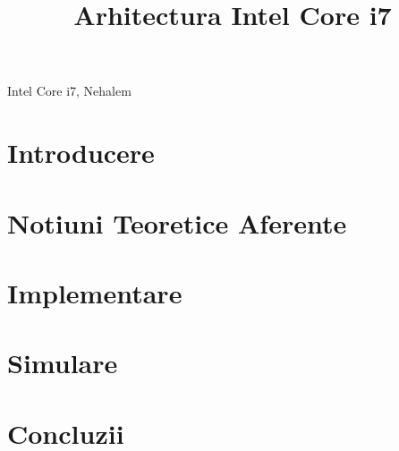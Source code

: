 \documentclass[conference]{IEEEtran}
\begin{document}
\title{Arhitectura Intel Core i7}

\author{
  }

 
\maketitle

\begin{IEEEkeywords}
Intel Core i7, Nehalem
\end{IEEEkeywords}

\section{Introducere}
\label{sec:introducere}


\section{Notiuni Teoretice Aferente}
\label{sec:notiuniteoretice}


\section{Implementare}
\label{sec:implementare}


\section{Simulare} 
\label{sec:simulare}


\section{Concluzii} 
\label{sec:concluzii}




\end{document}
